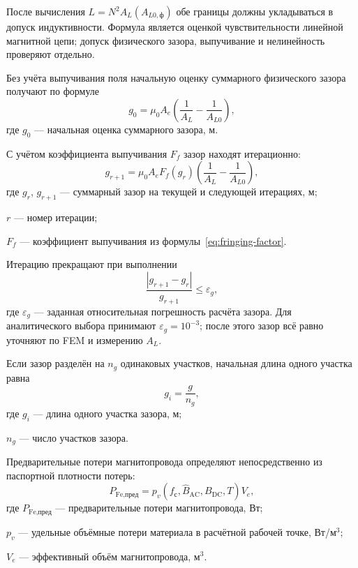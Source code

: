 \documentclass[14pt,a4paper]{extarticle}
\begin{document}
После вычисления $L=N^2A_L(A_{L0,\text{ф}})$ обе границы должны
укладываться в допуск индуктивности. Формула является оценкой
чувствительности линейной магнитной цепи; допуск физического зазора,
выпучивание и нелинейность проверяют отдельно.

Без учёта выпучивания поля начальную оценку суммарного физического
зазора получают по формуле
\begin{equation}
 g_0=\mu_0 A_e
 \left(
 \frac{1}{A_L}-\frac{1}{A_{L0}}
 \right),
 \label{eq:gap-ideal}
\end{equation}
где $g_0$ --- начальная оценка суммарного зазора, м.

С учётом коэффициента выпучивания $F_f$ зазор находят
итерационно:
\begin{equation}
 g_{r+1}=\mu_0 A_e F_f(g_r)
 \left(
 \frac{1}{A_L}-\frac{1}{A_{L0}}
 \right),
 \label{eq:gap-fringing}
\end{equation}
где $g_r$, $g_{r+1}$ --- суммарный зазор на текущей и следующей
итерациях, м;\par\noindent
$r$ --- номер итерации;\par\noindent
$F_f$ --- коэффициент выпучивания из
формулы~\eqref{eq:fringing-factor}.

Итерацию прекращают при выполнении
\begin{equation}
 \frac{\left|g_{r+1}-g_r\right|}{g_{r+1}}
 \leq\varepsilon_g,
 \label{eq:gap-iteration-stop}
\end{equation}
где $\varepsilon_g$ --- заданная относительная погрешность расчёта
зазора. Для аналитического выбора принимают
$\varepsilon_g=10^{-3}$; после этого зазор всё равно уточняют по FEM и
измерению $A_L$.

Если зазор разделён на $n_g$ одинаковых участков, начальная длина одного
участка равна
\begin{equation}
 g_i=\frac{g}{n_g},
 \label{eq:gap-split}
\end{equation}
где $g_i$ --- длина одного участка зазора, м;\par\noindent
$n_g$ --- число участков зазора.

Предварительные потери магнитопровода определяют непосредственно из
паспортной плотности потерь:
\begin{equation}
 P_{\text{Fe,пред}}=
 p_v\!\left(f_{\text{с}},\widehat B_{\text{AC}},
 B_{\text{DC}},T\right)V_e,
 \label{eq:core-loss-preliminary}
\end{equation}
где $P_{\text{Fe,пред}}$ --- предварительные потери магнитопровода, Вт;\par\noindent
$p_v$ --- удельные объёмные потери материала в расчётной рабочей точке,
Вт/м$^3$;\par\noindent
$V_e$ --- эффективный объём магнитопровода, м$^3$.
\end{document}

